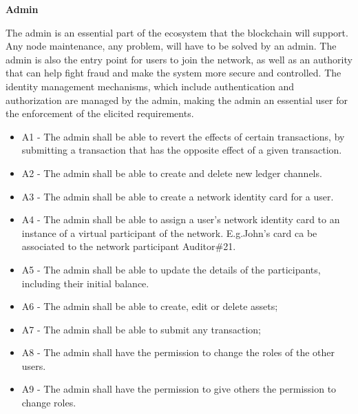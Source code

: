 		\par \textbf{Admin}
		
		The admin is an essential part of the ecosystem that the blockchain will support. Any node maintenance, any problem, will have to be solved by an admin. The admin is also the entry point for users to join the network, as well as an authority that can help fight fraud and make the system more secure and controlled. The identity management mechanisms, which include authentication and authorization are managed by the admin, making the admin an essential user for the enforcement of the elicited requirements.
		
		\begin{itemize}
			\item A1 - The admin shall be able to revert the effects of certain transactions, by submitting a transaction that has the opposite effect of a given transaction. %
			\item A2 - The admin shall be able to create and delete new ledger channels.
			\item A3 - The admin shall be able to create a network identity card for a user.
			\item A4 - The admin shall be able to assign a user's network identity card to an instance of a virtual participant of the network. E.g.John's card ca be associated to the network participant Auditor\#21.
			\item A5 - The admin shall be able to update the details of the participants, including their initial balance.
			\item A6 - The admin shall be able to create, edit or delete assets;
			\item A7 - The admin shall be able to submit any transaction;
			\item A8 - The admin shall have the permission to change the roles of the other users.
			\item A9 - The admin shall have the permission to give others the permission to change roles.
		\end{itemize}

